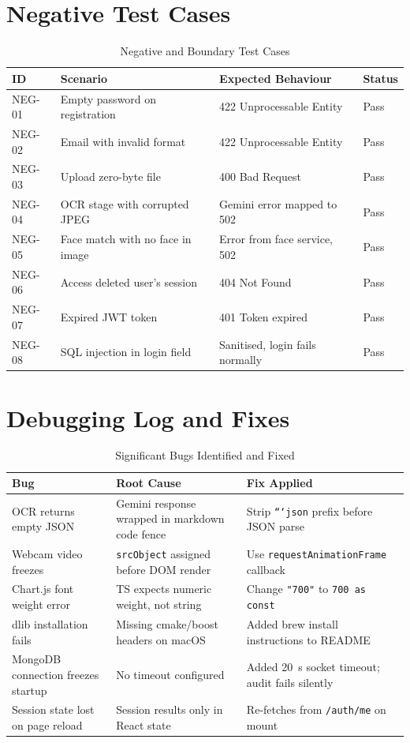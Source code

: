 \section{Negative Test Cases}

\begin{table}[H]
\centering
\caption{Negative and Boundary Test Cases}
\begin{tabular}{@{}p{1.5cm}p{5cm}p{4.5cm}p{2.5cm}@{}}
\toprule
\textbf{ID} & \textbf{Scenario} & \textbf{Expected Behaviour} & \textbf{Status} \\
\midrule
NEG-01 & Empty password on registration & 422 Unprocessable Entity & Pass \\
NEG-02 & Email with invalid format & 422 Unprocessable Entity & Pass \\
NEG-03 & Upload zero-byte file & 400 Bad Request & Pass \\
NEG-04 & OCR stage with corrupted JPEG & Gemini error mapped to 502 & Pass \\
NEG-05 & Face match with no face in image & Error from face service, 502 & Pass \\
NEG-06 & Access deleted user's session & 404 Not Found & Pass \\
NEG-07 & Expired JWT token & 401 Token expired & Pass \\
NEG-08 & SQL injection in login field & Sanitised, login fails normally & Pass \\
\bottomrule
\end{tabular}
\end{table}

\section{Debugging Log and Fixes}

\begin{table}[H]
\centering
\caption{Significant Bugs Identified and Fixed}
\begin{tabular}{@{}p{2cm}p{5cm}p{5cm}@{}}
\toprule
\textbf{Bug} & \textbf{Root Cause} & \textbf{Fix Applied} \\
\midrule
OCR returns empty JSON & Gemini response wrapped in markdown code fence & Strip \texttt{```json} prefix before JSON parse \\
Webcam video freezes & \texttt{srcObject} assigned before DOM render & Use \texttt{requestAnimationFrame} callback \\
Chart.js font weight error & TS expects numeric weight, not string & Change \texttt{"700"} to \texttt{700 as const} \\
dlib installation fails & Missing cmake/boost headers on macOS & Added brew install instructions to README \\
MongoDB connection freezes startup & No timeout configured & Added 20~s socket timeout; audit fails silently \\
Session state lost on page reload & Session results only in React state & Re-fetches from \texttt{/auth/me} on mount \\
\bottomrule
\end{tabular}
\end{table}

